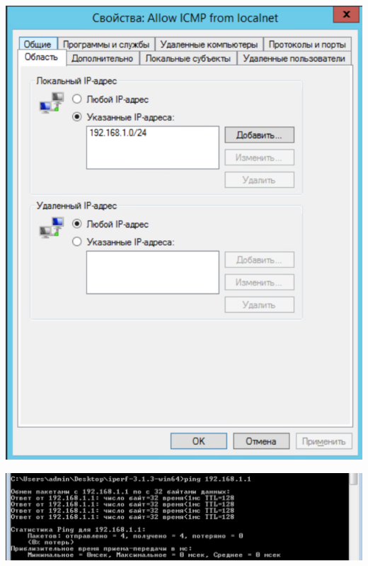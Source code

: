 \documentclass[a4paper,14pt]{extarticle}
\begin{document}
    \begin{center}
        \includegraphics[scale=0.7]{7.5.2.png}
    \end{center}

    \begin{center}
        \includegraphics[scale=0.8]{7.5.3.png}
    \end{center}
\end{document}
